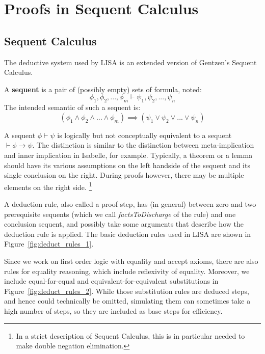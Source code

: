 \section{Proofs in Sequent Calculus}
\label{sect:proofs_lk}
\subsection{Sequent Calculus}
\label{subs:lk}
The deductive system used by LISA is an extended version of Gentzen's Sequent Calculus.
\begin{defin}
A \textbf{sequent} is a pair of (possibly empty) sets of formula, noted:
$$\phi_1, \phi_2, ..., \phi_m \vdash \psi_1, \psi_2, ..., \psi_n$$
The intended semantic of such a sequent is:
\begin{equation}
\label{eq:SequentSemantic}
(\phi_1 \land \phi_2 \land ... \land \phi_m ) \implies (\psi_1 \lor \psi_2 \lor ... \lor \psi_n )
\end{equation}

\end{defin}
A sequent $\phi \vdash \psi$ is logically but not conceptually equivalent to a sequent $\vdash \phi \rightarrow \psi$. The distinction is similar to the distinction between meta-implication and inner implication in Isabelle, for example. Typically, a theorem or a lemma should have its various assumptions on the left handside of the sequent and its single conclusion on the right. During proofs however, there may be multiple elements on the right side. \footnote{In a strict description of Sequent Calculus, this is in particular needed to make double negation elimination.}

A deduction rule, also called a proof step, has  (in general) between zero and two prerequisite sequents (which we call \textit{factsToDischarge} of the rule) and one conclusion sequent, and possibly take some arguments that describe how the deduction rule is applied. The basic deduction rules used in LISA are shown in Figure~\ref{fig:deduct_rules_1}.


Since we work on first order logic with equality and accept axioms, there are also rules for equality reasoning, which include reflexivity of equality. Moreover, we include equal-for-equal and equivalent-for-equivalent substitutions in Figure~\ref{fig:deduct_rules_2}. While those substitution rules are deduced steps, and hence could technically be omitted, simulating them can sometimes take a high number of steps, so they are included as base steps for efficiency. 

